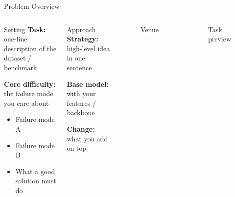 \documentclass[9pt,aspectratio=169]{beamer}
\begin{document}
\begin{frame}{Problem Overview}
  \begin{columns}[T,onlytextwidth]
      \begin{block}{Setting}
        \textbf{Task:} one-line description of the dataset / benchmark

        \textbf{Core difficulty:} the failure mode you care about
        \begin{itemize}
          \item Failure mode A
          \item Failure mode B
          \item What a good solution must do
        \end{itemize}
      \end{block}

      \begin{block}{Approach}
        \textbf{Strategy:} high-level idea in one sentence

        \textbf{Base model:} \methodname with your features / backbone

        \textbf{Change:} what you add on top
      \end{block}

      \begin{block}{}
        \vspace{-1.5em}
        \begin{figure}
          \centering
          \vspace{-1.2em}
          \caption{Venue}
          \vspace{-1.2em}
        \end{figure}
      \end{block}
      \vspace{-0.2cm}
      \begin{block}{}
        \vspace{-1.0em}
        \begin{figure}
          \centering
          \vspace{-1.2em}
          \caption{Task preview}
          \vspace{-1.2em}
        \end{figure}
      \end{block}
  \end{columns}
\end{frame}
\end{document}
